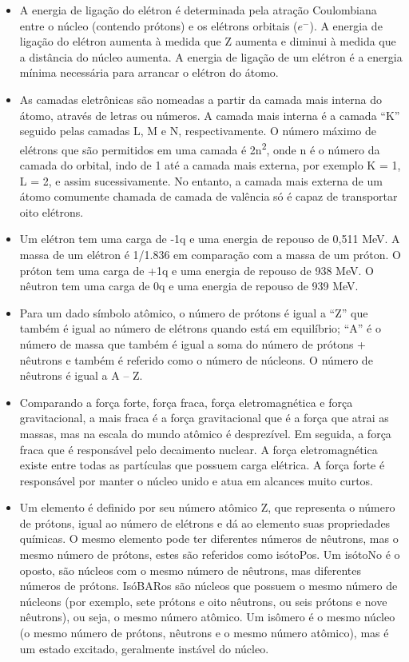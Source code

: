 \documentclass[11pt,a4paper]{article}
\newcounter{exemplo}
\begin{document}
\begin{exemplo}
\begin{itemize}
        \item A energia de ligação do elétron é determinada pela atração Coulombiana entre o núcleo (contendo prótons) e os elétrons orbitais ($e^{-}$). A energia de ligação do elétron aumenta à medida que Z aumenta e diminui à medida que a distância do núcleo aumenta. A energia de ligação de um elétron é a energia mínima necessária para arrancar o elétron do átomo.
        
        \item As camadas eletrônicas são nomeadas a partir da camada mais interna do átomo, através de letras ou números. A camada mais interna é a camada “K” seguido pelas camadas L, M e N, respectivamente. O número máximo de elétrons que são permitidos em uma camada é 2n\textsuperscript{2}, onde n é o número da camada do orbital, indo de 1 até a camada mais externa, por exemplo K = 1, L = 2, e assim sucessivamente. No entanto, a camada mais externa de um átomo comumente chamada de camada de valência só é capaz de transportar oito elétrons.
        
        \item Um elétron tem uma carga de -1q e uma energia de repouso de 0,511 MeV. A massa de um elétron é 1/1.836 em comparação com a massa de um próton. O próton tem uma carga de +1q e uma energia de repouso de 938 MeV. O nêutron tem uma carga de 0q e uma energia de repouso de 939 MeV.
        
        \item Para um dado símbolo atômico, o número de prótons é igual a “Z” que também é igual ao número de elétrons quando está em equilíbrio; “A” é o número de massa que também é igual a soma do número de prótons + nêutrons e também é referido como o número de núcleons. O número de nêutrons é igual a A – Z.
        
        \item Comparando a força forte, força fraca, força eletromagnética e força gravitacional, a mais fraca é a força gravitacional que é a força que atrai as massas, mas na escala do mundo atômico é desprezível. Em seguida, a força fraca que é responsável pelo decaimento nuclear. A força eletromagnética existe entre todas as partículas que possuem carga elétrica. A força forte é responsável por manter o núcleo unido e atua em alcances muito curtos.
        
        \item Um elemento é definido por seu número atômico Z, que representa o número de prótons, igual ao número de elétrons e dá ao elemento suas propriedades químicas. O mesmo elemento pode ter diferentes números de nêutrons, mas o mesmo número de prótons, estes são referidos como isótoPos. Um isótoNo é o oposto, são núcleos com o mesmo número de nêutrons, mas diferentes números de prótons. IsóBARos são núcleos que possuem o mesmo número de núcleons (por exemplo, sete prótons e oito nêutrons, ou seis prótons e nove nêutrons), ou seja, o mesmo número atômico. Um isômero é o mesmo núcleo (o mesmo número de prótons, nêutrons e o mesmo número atômico), mas é um estado excitado, geralmente instável do núcleo.
        

\end{itemize}
\end{exemplo}
\end{document}
